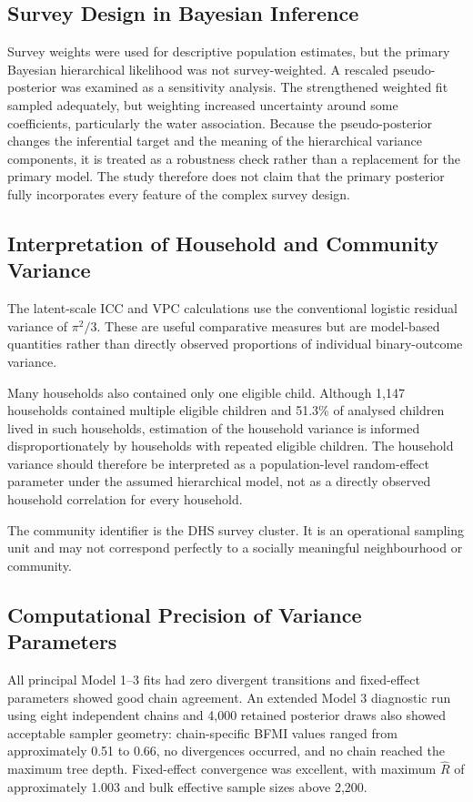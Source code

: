 \subsection{Survey Design in Bayesian Inference}

Survey weights were used for descriptive population estimates, but the primary Bayesian hierarchical likelihood was not survey-weighted. A rescaled pseudo-posterior was examined as a sensitivity analysis. The strengthened weighted fit sampled adequately, but weighting increased uncertainty around some coefficients, particularly the water association. Because the pseudo-posterior changes the inferential target and the meaning of the hierarchical variance components, it is treated as a robustness check rather than a replacement for the primary model. The study therefore does not claim that the primary posterior fully incorporates every feature of the complex survey design.

\subsection{Interpretation of Household and Community Variance}

The latent-scale ICC and VPC calculations use the conventional logistic residual variance of $\pi^2/3$. These are useful comparative measures but are model-based quantities rather than directly observed proportions of individual binary-outcome variance.

Many households also contained only one eligible child. Although 1,147 households contained multiple eligible children and 51.3\% of analysed children lived in such households, estimation of the household variance is informed disproportionately by households with repeated eligible children. The household variance should therefore be interpreted as a population-level random-effect parameter under the assumed hierarchical model, not as a directly observed household correlation for every household.

The community identifier is the DHS survey cluster. It is an operational sampling unit and may not correspond perfectly to a socially meaningful neighbourhood or community.

\subsection{Computational Precision of Variance Parameters}

All principal Model 1--3 fits had zero divergent transitions and fixed-effect parameters showed good chain agreement. An extended Model 3 diagnostic run using eight independent chains and 4,000 retained posterior draws also showed acceptable sampler geometry: chain-specific BFMI values ranged from approximately 0.51 to 0.66, no divergences occurred, and no chain reached the maximum tree depth. Fixed-effect convergence was excellent, with maximum $\hat R$ of approximately 1.003 and bulk effective sample sizes above 2,200.

